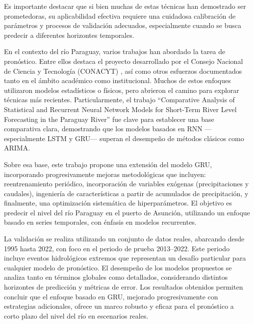 Es importante destacar que si bien muchas de estas técnicas han demostrado ser prometedoras, su aplicabilidad efectiva requiere una cuidadosa calibración de parámetros y procesos de validación adecuados, especialmente cuando se busca predecir a diferentes horizontes temporales.

En el contexto del río Paraguay, varios trabajos han abordado la tarea de pronóstico. Entre ellos destaca el proyecto desarrollado por el Consejo Nacional de Ciencia y Tecnología (CONACYT) \cite{sistema-pronostico-conacyt-14-INV-280}, así como otros esfuerzos documentados tanto en el ámbito académico como institucional. Muchos de estos enfoques utilizaron modelos estadísticos o físicos, pero abrieron el camino para explorar técnicas más recientes. Particularmente, el trabajo “Comparative Analysis of Statistical and Recurrent Neural Network Models for Short-Term River Level Forecasting in the Paraguay River” \cite{amarilla2023comparative} fue clave para establecer una base comparativa clara, demostrando que los modelos basados en RNN —especialmente LSTM y GRU— superan el desempeño de métodos clásicos como ARIMA.

Sobre esa base, este trabajo propone una extensión del modelo GRU, incorporando progresivamente mejoras metodológicas que incluyen: reentrenamiento periódico, incorporación de variables exógenas (precipitaciones y caudales), ingeniería de características a partir de acumulados de precipitación, y finalmente, una optimización sistemática de hiperparámetros. El objetivo es predecir el nivel del río Paraguay en el puerto de Asunción, utilizando un enfoque basado en series temporales, con énfasis en modelos recurrentes.

La validación se realiza utilizando un conjunto de datos reales, abarcando desde 1995 hasta 2022, con foco en el periodo de prueba 2013–2022. Este periodo incluye eventos hidrológicos extremos que representan un desafío particular para cualquier modelo de pronóstico. El desempeño de los modelos propuestos se analiza tanto en términos globales como detallados, considerando distintos horizontes de predicción y métricas de error. Los resultados obtenidos permiten concluir que el enfoque basado en GRU, mejorado progresivamente con estrategias adicionales, ofrece un marco robusto y eficaz para el pronóstico a corto plazo del nivel del río en escenarios reales.

